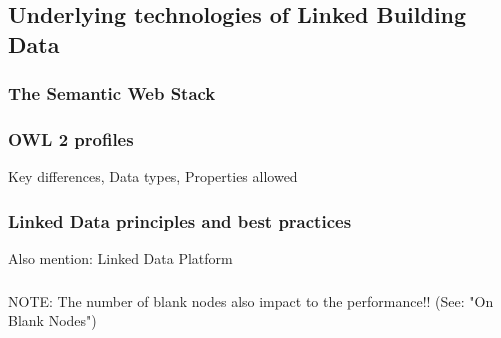 \subsection{Underlying technologies of Linked Building Data}

\subsubsection{The Semantic Web Stack}


\subsubsection{OWL 2 profiles}


Key differences, Data types, Properties allowed



\subsubsection{Linked Data principles and best practices}

Also mention: Linked Data Platform



\subsubsection{}





NOTE: The number of blank nodes also impact to the performance!! (See: "On Blank Nodes")